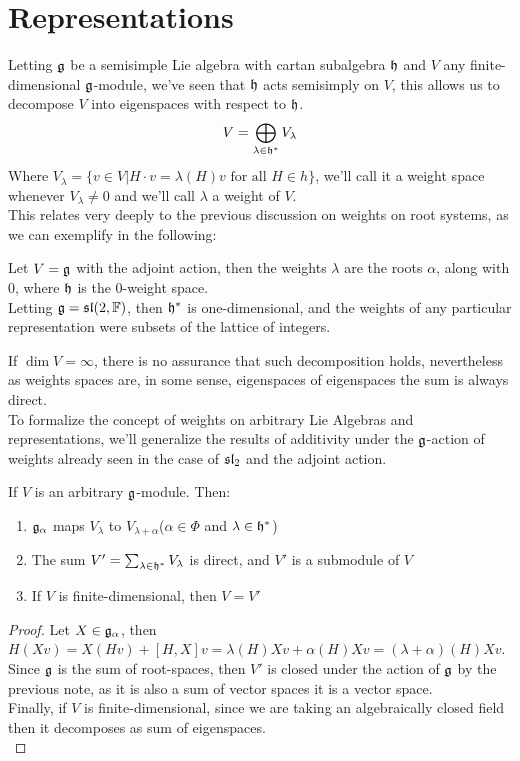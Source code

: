 \section{Representations}
\label{sec:42Represetantion}
Letting $\mathfrak{g}$ be a semisimple Lie algebra with cartan subalgebra $\mathfrak{h}$ and $V$ any finite-dimensional $\mathfrak{g}$-module, we've seen that $\mathfrak{h}$ acts semisimply on $V$, this allows us to decompose $V$ into eigenspaces with respect to $\mathfrak{h}$.
$$ V = \bigoplus_{\lambda \in \mathfrak{h}^*} V_\lambda$$
Where $V_\lambda=\{v \in V| H\cdot v=\lambda(H)v \text{ for all } H \in h\}$, we'll call it a weight space whenever $V_\lambda \not= 0$	and we'll call $\lambda$ a weight of $V$.\\
This relates very deeply to the previous discussion on weights on root systems, as we can exemplify in the following:
\begin{ex}
Let $V=\mathfrak{g}$ with the adjoint action, then the weights $\lambda$ are the roots $\alpha$, along with $0$, where $\mathfrak{h}$ is the $0$-weight space.\\
Letting $\mathfrak{g}=\mathfrak{sl}(2,\mathbb{F})$, then $\mathfrak{h}^*$ is one-dimensional, and the weights of any particular representation were subsets of the lattice of integers.\\
\end{ex}
If $\dim V = \infty$, there is no assurance that such decomposition holds, nevertheless as weights spaces are, in some sense, eigenspaces of eigenspaces the sum is always direct.\\
To formalize the concept of weights on arbitrary Lie Algebras and representations, we'll generalize the results of additivity under the $\mathfrak{g}$-action of weights already seen in the case of $\mathfrak{sl}_2$ and the adjoint action.\\
\begin{lema}
If $V$ is an arbitrary $\mathfrak{g}$-module. Then:
\begin{enumerate}[label=(\alph*)]
\item $\mathfrak{g}_\alpha$ maps $V_\lambda$ to $V_{\lambda+\alpha}$($\alpha \in \Phi$ and $\lambda \in \mathfrak{h}^*$)
\item The sum $V' = \sum_{\lambda \in \mathfrak{h}^*} V_{\lambda}$ is direct, and $V'$ is a submodule of $V$
\item If $V$ is finite-dimensional, then $V=V'$
\end{enumerate}
\end{lema}
\begin{proof}
Let $X \in \mathfrak{g}_{\alpha}$, then $H(Xv) = X(Hv) + [H,X]v = \lambda(H)Xv + \alpha(H)Xv = (\lambda+\alpha)(H)Xv$.\\
Since $\mathfrak{g}$ is the sum of root-spaces, then $V'$ is closed under the action of $\mathfrak{g}$ by the previous note, as it is also a sum of vector spaces it is a vector space.\\
Finally, if $V$ is finite-dimensional, since we are taking an algebraically closed field then it decomposes as sum of eigenspaces.\\
\end{proof}\\
